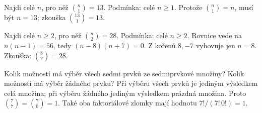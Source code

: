 \documentclass[11pt,a4paper]{article}
\begin{document}
\begin{zadaniReseniBox}[title={Úloha C3}]
Najdi celé $n$, pro něž $\binom n1=13$.
\tcblower
Podmínka: celé $n\geq1$. Protože $\binom n1=n$, musí být $n=13$; zkouška $\binom{13}{1}=13$.
\end{zadaniReseniBox}

\begin{zadaniReseniBox}[title={Úloha C4}]
Najdi celé $n\geq2$, pro něž $\binom n2=28$.
\tcblower
Podmínka: celé $n\geq2$. Rovnice vede na $n(n-1)=56$, tedy $(n-8)(n+7)=0$. Z kořenů $8,-7$ vyhovuje jen $n=8$. Zkouška: $\binom82=28$.
\end{zadaniReseniBox}

\begin{zadaniReseniBox}[title={Úloha C5}]
Kolik možností má výběr všech sedmi prvků ze sedmiprvkové množiny? Kolik možností má výběr žádného prvku?
\tcblower
Při výběru všech prvků je jediným výsledkem celá množina; při výběru žádného jediným výsledkem prázdná množina. Proto $\binom77=\binom70=1$. Také oba faktoriálové zlomky mají hodnotu $7!/(7!\,0!)=1$.
\end{zadaniReseniBox}


\end{document}
